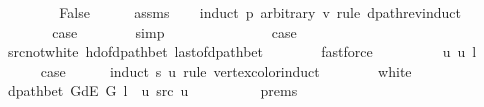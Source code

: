 \begin{isabellebody}
\ \ \ \ \isacommand{{\isachardot}{\kern0pt}{\isachardot}{\kern0pt}}\isamarkupfalse%
\isanewline
\ \ \isamarkupfalse%
\ False\isanewline
\ \ \ \ \isamarkupfalse%
\ assms\isanewline
\ \ \isamarkupfalse%
\ {\isacharparenleft}{\kern0pt}induct\ p\ arbitrary{\isacharcolon}{\kern0pt}\ v\ rule{\isacharcolon}{\kern0pt}\ dpath{\isacharunderscore}{\kern0pt}rev{\isacharunderscore}{\kern0pt}induct{\isacharparenright}{\kern0pt}\isanewline
\ \ \ \ \isamarkupfalse%
\ {}\isanewline
\ \ \ \ \isamarkupfalse%
\ {\isacharquery}{\kern0pt}case\isanewline
\ \ \ \ \ \ \isamarkupfalse%
\ simp\isanewline
\ \ \isamarkupfalse%
\isanewline
\ \ \ \ \isamarkupfalse%
\ {}\isanewline
\ \ \ \ \isamarkupfalse%
\ {\isacharquery}{\kern0pt}case\isanewline
\ \ \ \ \ \ \isamarkupfalse%
\ src{\isacharunderscore}{\kern0pt}not{\isacharunderscore}{\kern0pt}white\ hd{\isacharunderscore}{\kern0pt}of{\isacharunderscore}{\kern0pt}dpath{\isacharunderscore}{\kern0pt}bet{\isacharprime}{\kern0pt}\ last{\isacharunderscore}{\kern0pt}of{\isacharunderscore}{\kern0pt}dpath{\isacharunderscore}{\kern0pt}bet\isanewline
\ \ \ \ \ \ \isamarkupfalse%
\ fastforce\isanewline
\ \ \isamarkupfalse%
\isanewline
\ \ \ \ \isamarkupfalse%
\ {\isacharparenleft}{\kern0pt}{}\ u\ u{\isacharprime}{\kern0pt}\ l{\isacharparenright}{\kern0pt}\isanewline
\ \ \ \ \isamarkupfalse%
\ {\isacharquery}{\kern0pt}case\isanewline
\ \ \ \ \isamarkupfalse%
\ {\isacharparenleft}{\kern0pt}induct\ s\ u\ rule{\isacharcolon}{\kern0pt}\ vertex{\isacharunderscore}{\kern0pt}color{\isacharunderscore}{\kern0pt}induct{\isacharparenright}{\kern0pt}\isanewline
\ \ \ \ \ \ \isamarkupfalse%
\ white\isanewline
\ \ \ \ \ \ \isamarkupfalse%
\ {\isachardoublequoteopen}dpath{\isacharunderscore}{\kern0pt}bet\ {\isacharparenleft}{\kern0pt}G{\isachardot}{\kern0pt}dE\ G{\isacharparenright}{\kern0pt}\ {\isacharparenleft}{\kern0pt}l\ {\isacharat}{\kern0pt}\ {\isacharbrackleft}{\kern0pt}u{\isacharbrackright}{\kern0pt}{\isacharparenright}{\kern0pt}\ src\ u{\isachardoublequoteclose}\isanewline
\ \ \ \ \ \ \ \ \isamarkupfalse%
\ {\isachardoublequoteopen}{}{\isachardot}{\kern0pt}prems{\isachardoublequoteclose}{\isacharparenleft}{\kern0pt}{}{\isacharparenright}{\kern0pt}\isanewline
\ \ \ \ \ \ \ \ \isamarkupfalse%

\end{isabellebody}
